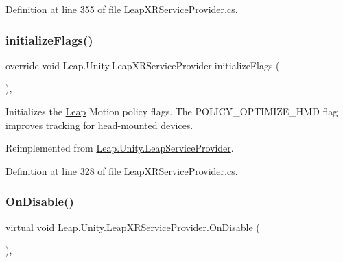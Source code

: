 Definition at line 355 of file Leap\+X\+R\+Service\+Provider.\+cs.

\mbox{\label{class_leap_1_1_unity_1_1_leap_x_r_service_provider_ae0e6b7d1c684d872acf237357ace286c}} 
\subsubsection{\texorpdfstring{initializeFlags()}{initializeFlags()}}
{\footnotesize\ttfamily override void Leap.\+Unity.\+Leap\+X\+R\+Service\+Provider.\+initialize\+Flags (\begin{DoxyParamCaption}{ }\end{DoxyParamCaption})\hspace{0.3cm}{\ttfamily [protected]}, {\ttfamily [virtual]}}



Initializes the \mbox{\hyperlink{namespace_leap_1_1_unity_1_1_leap}{Leap}} Motion policy flags. The P\+O\+L\+I\+C\+Y\+\_\+\+O\+P\+T\+I\+M\+I\+Z\+E\+\_\+\+H\+MD flag improves tracking for head-\/mounted devices. 



Reimplemented from \mbox{\hyperlink{class_leap_1_1_unity_1_1_leap_service_provider_ac6ec54a97c1d2e1bbbe663822b458140}{Leap.\+Unity.\+Leap\+Service\+Provider}}.



Definition at line 328 of file Leap\+X\+R\+Service\+Provider.\+cs.

\mbox{\label{class_leap_1_1_unity_1_1_leap_x_r_service_provider_ad9014e823bfcbb99666f23028dd7ff49}} 
\subsubsection{\texorpdfstring{OnDisable()}{OnDisable()}}
{\footnotesize\ttfamily virtual void Leap.\+Unity.\+Leap\+X\+R\+Service\+Provider.\+On\+Disable (\begin{DoxyParamCaption}{ }\end{DoxyParamCaption})\hspace{0.3cm}{\ttfamily [protected]}, {\ttfamily [virtual]}}



